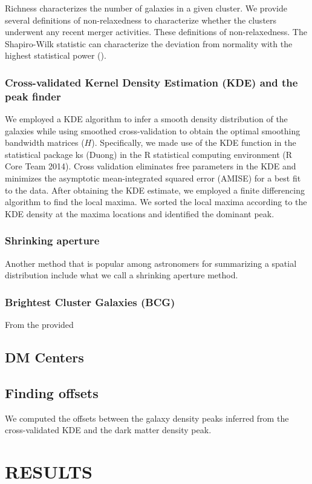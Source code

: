 \documentclass[letterpaper,useAMS,usenatbib]{mn2e}
\begin{document}
Richness characterizes the number of galaxies in a given cluster.
We provide several definitions of non-relaxedness to characterize whether
the clusters underwent any recent merger activities. These definitions of
non-relaxedness.
The Shapiro-Wilk statistic can characterize the deviation from normality
with the highest statistical power ().


\subsubsection{Cross-validated Kernel Density Estimation (KDE) and the peak finder} 
We employed a KDE algorithm to infer a smooth density distribution of the
galaxies while using smoothed cross-validation to obtain the optimal smoothing
bandwidth matrices ($H$). Specifically, we made use of the KDE function in
the statistical package ks (Duong) in the R statistical computing environment (R Core Team 2014).
Cross validation eliminates free parameters in the KDE and minimizes
the asymptotic mean-integrated squared error (AMISE) for a best fit to the
data.
After obtaining the KDE estimate, we employed a finite differencing algorithm
to find the local maxima. We sorted the local maxima according to the KDE
density at the maxima locations and identified the dominant peak. 

\subsubsection{Shrinking aperture}
Another method that is popular among astronomers for summarizing a spatial
distribution include what we call a shrinking aperture method.
\subsubsection{Brightest Cluster Galaxies (BCG)}
From the provided 


\subsection{DM Centers}
\subsection{Finding offsets} 


We computed the offsets between the galaxy density peaks inferred from the
cross-validated KDE and the dark matter density peak. 

\section{RESULTS} 
\end{document}
